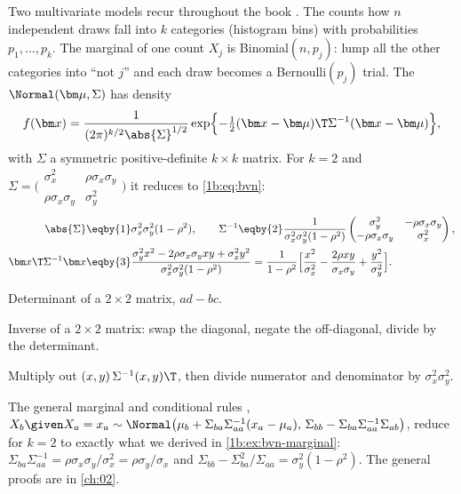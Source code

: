 Two multivariate models recur throughout the book . The
 counts how $n$ independent draws fall into $k$
categories (histogram bins) with probabilities $p_1,\dots,p_k$. The marginal
of one count $X_j$ is Binomial$(n,p_j)$: lump all the other categories into
``not $j$'' and each draw becomes a Bernoulli$(p_j)$ trial. The
 $\Normal(\bm\mu,\Sigma)$ has density
\begin{equation}
  f(\bm x)=\frac{1}{(2\pi)^{k/2}\abs{\Sigma}^{1/2}}
  \exp\Bigl\{-\tfrac12(\bm x-\bm\mu)\T\Sigma^{-1}(\bm x-\bm\mu)\Bigr\},
  \label{1b:eq:mvn}
\end{equation}
with $\Sigma$ a symmetric positive-definite $k\times k$ matrix. For $k=2$ and
$\Sigma=\bigl(\begin{smallmatrix}\sigma_x^2&\rho\sigma_x\sigma_y\\
\rho\sigma_x\sigma_y&\sigma_y^2\end{smallmatrix}\bigr)$ it reduces to
\eqref{1b:eq:bvn}:
\begin{align*}
  \abs{\Sigma}
  &\eqby{1} \sigma_x^2\sigma_y^2(1-\rho^2),\qquad
  \Sigma^{-1}\eqby{2}\frac{1}{\sigma_x^2\sigma_y^2(1-\rho^2)}
   \begin{pmatrix}\sigma_y^2&-\rho\sigma_x\sigma_y\\-\rho\sigma_x\sigma_y&\sigma_x^2\end{pmatrix},\\
  \bm x\T\Sigma^{-1}\bm x
  &\eqby{3} \frac{\sigma_y^2x^2-2\rho\sigma_x\sigma_yxy+\sigma_x^2y^2}{\sigma_x^2\sigma_y^2(1-\rho^2)}
   = \frac{1}{1-\rho^2}\Bigl[\frac{x^2}{\sigma_x^2}-\frac{2\rho xy}{\sigma_x\sigma_y}+\frac{y^2}{\sigma_y^2}\Bigr].
\end{align*}
\begin{explain}
  \item Determinant of a $2\times2$ matrix, $ad-bc$.
  \item Inverse of a $2\times2$ matrix: swap the diagonal, negate the
        off-diagonal, divide by the determinant.
  \item Multiply out $(x,y)\,\Sigma^{-1}(x,y)\T$, then divide numerator and
        denominator by $\sigma_x^2\sigma_y^2$.
\end{explain}
The general marginal and conditional rules ,
$X_b\given X_a=x_a\sim\Normal\bigl(\mu_b+\Sigma_{ba}\Sigma_{aa}^{-1}(x_a-\mu_a),\,
\Sigma_{bb}-\Sigma_{ba}\Sigma_{aa}^{-1}\Sigma_{ab}\bigr)$, reduce for $k=2$ to
exactly what we derived in \cref{1b:ex:bvn-marginal}:
$\Sigma_{ba}\Sigma_{aa}^{-1}=\rho\sigma_x\sigma_y/\sigma_x^2=\rho\sigma_y/\sigma_x$
and $\Sigma_{bb}-\Sigma_{ba}^2/\Sigma_{aa}=\sigma_y^2(1-\rho^2)$. The general
proofs are in \cref{ch:02}.

